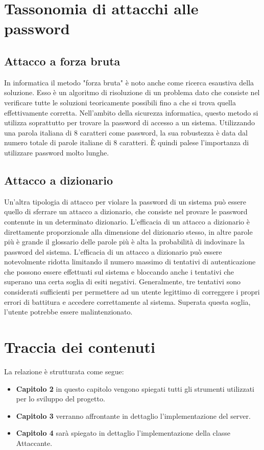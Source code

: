 \documentclass[a4paper,12pt,titlepage,oneside,openany]{book}
\begin{document}
\section{Tassonomia di attacchi alle password}
\subsection{Attacco a forza bruta}
In informatica il metodo "forza bruta" è noto anche come ricerca esaustiva della soluzione. Esso è un algoritmo di risoluzione di un problema dato che consiste nel verificare tutte le soluzioni teoricamente possibili fino a che si trova quella effettivamente corretta. Nell'ambito della sicurezza informatica, questo metodo si utilizza soprattutto per trovare la password di accesso a un sistema. Utilizzando una parola italiana di 8 caratteri come password, la sua robustezza è data dal numero totale di parole italiane di 8 caratteri. È quindi palese l'importanza di utilizzare password molto lunghe.
\subsection{Attacco a dizionario}
Un'altra tipologia di attacco per violare la password di un sistema può essere quello di sferrare un attacco a dizionario, che consiste nel provare le password contenute in un determinato dizionario. L'efficacia di un attacco a dizionario è direttamente proporzionale alla dimensione del dizionario stesso, in altre parole più è grande il glossario delle parole più è alta la probabilità di indovinare la password del sistema. L'efficacia di un attacco a dizionario può essere notevolmente ridotta limitando il numero massimo di tentativi di autenticazione che possono essere effettuati sul sistema e bloccando anche i tentativi che superano una certa soglia di esiti negativi. Generalmente, tre tentativi sono considerati sufficienti per permettere ad un utente legittimo di correggere i propri errori di battitura e accedere correttamente al sistema. Superata questa soglia, l'utente potrebbe essere malintenzionato.
\section{Traccia dei contenuti}
La relazione è strutturata come segue:
\begin{itemize}
	\item[]\textbf{Capitolo 2 } in questo capitolo vengono spiegati tutti gli strumenti utilizzati per lo sviluppo del progetto.
	\item[]\textbf{Capitolo 3 } verranno affrontante in dettaglio l'implementazione del server.
	\item[]\textbf{Capitolo 4 } sarà spiegato in dettaglio l'implementazione della classe Attaccante.
\end{itemize}
\end{document}
